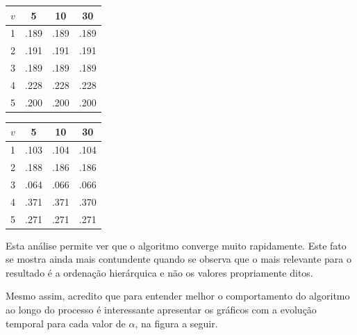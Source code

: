 \documentclass[l15, tikzdraw]{homework}
\begin{document}
	\begin{multicols}{2}
		\begin{fig}[$\alpha = 0.1$]
			\begin{tabular}{|c|c|c|c|}
				\hline
				$v$ & 5 & 10 & 30\\
				\hline
				1 & .189 & .189 & .189\\
				\hline
				2 & .191 & .191 & .191\\
				\hline
				3 & .189 & .189 & .189\\
				\hline
				4 & .228 & .228 & .228\\
				\hline
				5 & .200 & .200 & .200\\
				\hline
			\end{tabular}
		\end{fig}
	
		\begin{fig}[$\alpha = 0.9$]
			\begin{tabular}{|c|c|c|c|}
				\hline
				$v$ & 5 & 10 & 30\\
				\hline
				1 & .103 & .104 & .104\\
				\hline
				2 & .188 & .186 & .186\\
				\hline
				3 & .064 & .066 & .066\\
				\hline
				4 & .371 & .371 & .370\\
				\hline
				5 & .271 & .271 & .271\\
				\hline
			\end{tabular}
		\end{fig}
	\end{multicols}

	Esta análise permite ver que o algoritmo converge muito rapidamente. Este fato se mostra ainda mais contundente quando se observa que o mais relevante para o resultado é a ordenação hierárquica e não os valores propriamente ditos.\par

	Mesmo assim, acredito que para entender melhor o comportamento do algoritmo ao longo do processo é interessante apresentar os gráficos com a evolução temporal para cada valor de $\alpha$, na figura a seguir.
\end{document}
